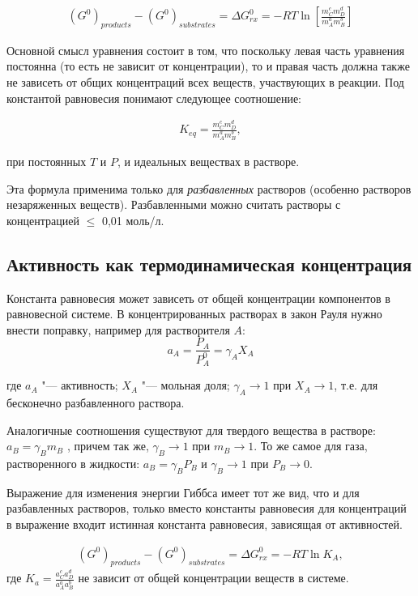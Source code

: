 \documentclass[12pt,a4paper,oneside]{book}
\begin{document}
\begin{align}
(G^0)_{products} - (G^0)_{substrates} = \Delta G_{rx}^0 = -RT \ln \left[ \frac{m_C^c m_D^d}{m_A^a m_B^b} \right ]
\end{align}

Основной смысл уравнения состоит в том, что поскольку левая часть уравнения постоянна (то есть не зависит от концентрации), то и правая часть должна также не зависеть от общих концентраций всех веществ, участвующих в реакции.
Под константой равновесия понимают следующее соотношение:

\begin{align}
	K_{eq} = \frac{m_C^c m_D^d}{m_A^a m_B^b},
\end{align}

при постоянных $T$ и $P$, и идеальных веществах в растворе.

Эта формула применима только для \textit{разбавленных} растворов (особенно растворов незаряженных веществ). Разбавленными можно считать растворы с концентрацией $\leq$ 0,01 моль/л.


\subsection{Активность как термодинамическая концентрация}


Константа равновесия может зависеть от общей концентрации компонентов в равновесной системе. В концентрированных растворах в закон Рауля нужно внести поправку, например для растворителя $A$:
\begin{equation}
	\label{raul}
	a_A = \frac{P_A}{P_A^0} = \gamma_A X_A
\end{equation}

где $a_A$ "--- активность; $X_A$ "--- мольная доля; $\gamma_A \rightarrow 1$ при $X_A \rightarrow 1$, т.е. для бесконечно разбавленного раствора.
 
Аналогичные соотношения существуют для твердого вещества в растворе: $a_B = \gamma_B m_B$ , причем так же, $\gamma_B \rightarrow 1$ при $m_B \rightarrow 1$. То же самое для газа, растворенного в жидкости: $a_B = \gamma_B P_B$ и $\gamma_B \rightarrow 1$ при $P_B \rightarrow 0$.

Выражение для изменения энергии Гиббса имеет тот же вид, что и для разбавленных растворов, только вместо константы равновесия для концентраций в выражение входит истинная константа равновесия, зависящая от активностей.  

\begin{align}
(G^0)_{products} - (G^0)_{substrates} = \Delta G_{rx}^0 = -RT \ln K_A,
\end{align}
где $K_a = \frac{a_C^c a_D^d}{a_A^a a_B^b}$ не зависит от общей концентрации веществ в системе. 
\end{document}
